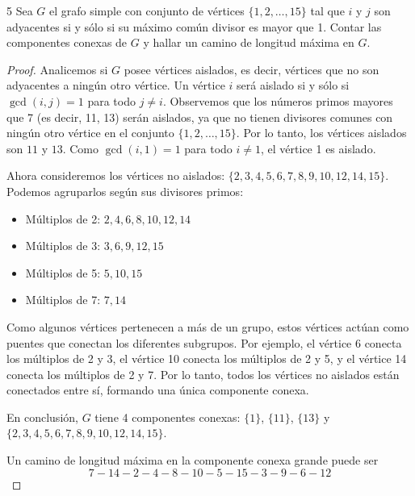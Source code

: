 \begin{ejercicioEntregar}{5}
    Sea \( G \) el grafo simple con conjunto de vértices \( \{1, 2, \ldots, 15\} \) tal que \( i \) y \( j \) son adyacentes si y sólo si su máximo común divisor es mayor que 1. Contar las componentes conexas de \( G \) y hallar un camino de longitud máxima en \( G \).
\end{ejercicioEntregar}
\begin{proof}
    Analicemos si \( G \) posee vértices aislados, es decir, vértices que no son adyacentes a ningún otro vértice. Un vértice \( i \) será aislado si y sólo si \(\gcd(i,j) = 1\) para todo \( j \neq i \). Observemos que los números primos mayores que 7 (es decir, 11, 13) serán aislados, ya que no tienen divisores comunes con ningún otro vértice en el conjunto \( \{1, 2, \ldots, 15\} \). Por lo tanto, los vértices aislados son \( 11 \) y \( 13 \). Como \( \gcd(i, 1) = 1 \) para todo \( i \neq 1 \), el vértice 1 es aislado.

    Ahora consideremos los vértices no aislados: \( \{2, 3, 4, 5, 6, 7, 8, 9, 10, 12, 14, 15\} \). Podemos agruparlos según sus divisores primos:
    \begin{itemize}
        \item Múltiplos de 2: \(2, 4, 6, 8, 10, 12, 14\)
        \item Múltiplos de 3: \(3, 6, 9, 12, 15\)
        \item Múltiplos de 5: \(5, 10, 15\)
        \item Múltiplos de 7: \(7, 14\)
    \end{itemize}

    Como algunos vértices pertenecen a más de un grupo, estos vértices actúan como puentes que conectan los diferentes subgrupos. Por ejemplo, el vértice 6 conecta los múltiplos de 2 y 3, el vértice 10 conecta los múltiplos de 2 y 5, y el vértice 14 conecta los múltiplos de 2 y 7. Por lo tanto, todos los vértices no aislados están conectados entre sí, formando una única componente conexa.

    En conclusión, \( G \) tiene 4 componentes conexas: \( \{ 1 \} \), \( \{11\} \), \( \{13\} \) y \( \{2, 3, 4, 5, 6, 7, 8, 9, 10, 12, 14, 15\} \).

    Un camino de longitud máxima en la componente conexa grande puede ser \[ 7 - 14 - 2 - 4 - 8 - 10 - 5 - 15 - 3 - 9 - 6 - 12 \]
\end{proof}

\vspace{0.5cm}

